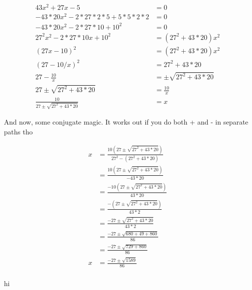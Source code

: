 \documentclass{article}
\begin{document}
\begin{align*}
43x^2+27x-5&=0\\
-43*20x^2-2*27*2*5+5*5*2*2&=0\\
-43*20x^2-2*27*10+10^2&=0\\
27^2x^2-2*27*10x+10^2&=(27^2+43*20)x^2\\
(27x-10)^2&=(27^2+43*20)x^2\\
(27-10/x)^2&=27^2+43*20\\
27-\frac{10}x&=\pm\sqrt{27^2+43*20}\\
27\pm\sqrt{27^2+43*20}&=\frac{10}x\\
\frac{10}{27\pm\sqrt{27^2+43*20}}&=x
\end{align*}

And now, some conjugate magic.  It works out if you do both + and - in separate paths tho

\begin{align*}
x&=\frac{10(27\pm\sqrt{27^2+43*20})}{27^2-(27^2+43*20)}\\
&=\frac{10(27\pm\sqrt{27^2+43*20})}{-43*20}\\
&=\frac{-10(27\pm\sqrt{27^2+43*20})}{43*20}\\
&=\frac{-(27\pm\sqrt{27^2+43*20})}{43*2}\\
&=\frac{-27\pm\sqrt{27^2+43*20}}{43*2}\\
&=\frac{-27\pm\sqrt{680+49+860}}{86}\\
&=\frac{-27\pm\sqrt{729+860}}{86}\\
x&=\frac{-27\pm\sqrt{1589}}{86}\\
\end{align*}

\begin{stonk}
hi
\end{stonk}
\end{document}
